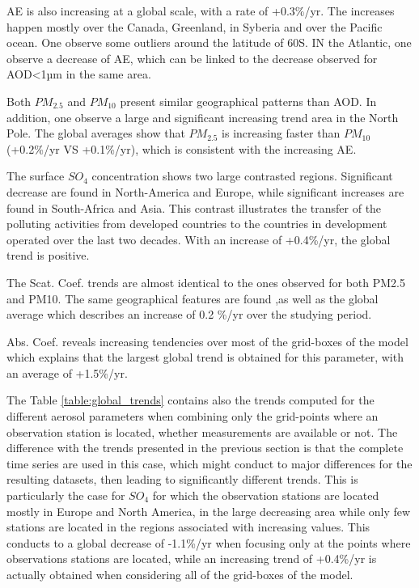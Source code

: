 \documentclass[journal abbreviation, manuscript]{copernicus}
\begin{document}
AE is also increasing  at a global scale, with a rate of +0.3\%/yr. The increases happen mostly over the Canada, Greenland, in Syberia and over the Pacific ocean. One observe some outliers around the latitude of 60\textdegree S.
IN the Atlantic, one observe a decrease of AE, which can be linked to the decrease observed for AOD<1µm in the same area.

Both $PM_{2.5}$ and $PM_{10}$ present similar geographical patterns than AOD. In addition, one observe a large and significant increasing trend area in the North Pole. The global averages show that $PM_{2.5}$ is increasing faster than $PM_{10}$  (+0.2\%/yr VS +0.1\%/yr), which is consistent with the increasing AE.

The surface $SO_{4}$ concentration shows two large contrasted regions. Significant decrease are found in North-America and Europe, while significant increases are found in South-Africa and Asia. This contrast illustrates the transfer of the polluting activities from developed countries to the countries in development operated over the last two decades. With an increase of +0.4\%/yr, the global trend is positive.

The Scat. Coef. trends are almost identical to the ones observed for both PM2.5 and PM10. The same geographical features are found ,as well as the global average which describes an increase of 0.2 \%/yr over the studying period.

Abs. Coef. reveals increasing tendencies over most of the grid-boxes of the model which explains that the largest global trend is obtained for this parameter, with an average of +1.5\%/yr.

The Table \ref{table:global_trends} contains also the trends computed for the different aerosol parameters when combining only the grid-points where an observation station is located, whether measurements are available or not. The difference with the trends presented in the previous section is that the complete time series are used in this case, which might conduct to major differences for the resulting datasets, then leading to significantly different trends. This is particularly the case for $SO_{4}$ for which the observation stations are located mostly in Europe and North America, in the large decreasing area while only few stations are located in the regions associated with increasing values. This conducts to a global decrease of -1.1\%/yr when focusing only at the points where observations stations are located, while an increasing trend of +0.4\%/yr is actually obtained when considering all of the grid-boxes of the model.
\end{document}
